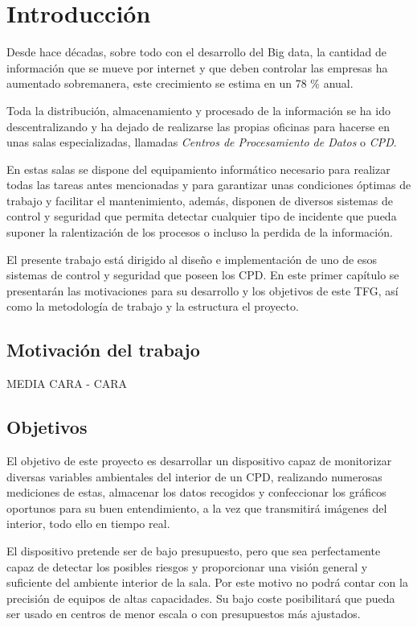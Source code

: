 \chapter{Introducción} 
\label{ch:introduccion}
Desde hace décadas, sobre todo con el desarrollo del Big data, la cantidad de información que se mueve por internet y que deben controlar las empresas ha aumentado sobremanera, este crecimiento se estima en un 78 \% anual\cite{monleon-getino_impacto_2015}.

Toda la distribución, almacenamiento y procesado de la información se ha ido descentralizando y ha dejado de realizarse las propias oficinas para hacerse en unas salas especializadas, llamadas \textit{Centros de Procesamiento de Datos} o \textit{CPD}. 

En estas salas se dispone del equipamiento informático necesario para realizar todas las tareas antes mencionadas y para garantizar unas condiciones óptimas de trabajo y facilitar el mantenimiento, además, disponen de diversos sistemas de control y seguridad que permita detectar cualquier tipo de incidente que pueda suponer la ralentización de los procesos o incluso la perdida de la información.

El presente trabajo está dirigido al diseño e implementación de uno de esos sistemas de control y seguridad que poseen los CPD. En este primer capítulo se presentarán las motivaciones para su desarrollo y los objetivos de este TFG, así como la metodología de trabajo y la estructura el proyecto.

\section{Motivación del trabajo}
MEDIA CARA - CARA

\section{Objetivos}
El objetivo de este proyecto es desarrollar un dispositivo capaz de monitorizar diversas variables ambientales del interior de un CPD, realizando numerosas mediciones de estas, almacenar los datos recogidos y confeccionar los gráficos oportunos para su buen entendimiento, a la vez que transmitirá imágenes del interior, todo ello en tiempo real.

El dispositivo pretende ser de bajo presupuesto, pero que sea perfectamente capaz de detectar los posibles riesgos y proporcionar una visión general y suficiente del ambiente interior de la sala. Por este motivo no podrá contar con la precisión de equipos de altas capacidades. Su bajo coste posibilitará que pueda ser usado en centros de menor escala o con presupuestos más ajustados.

